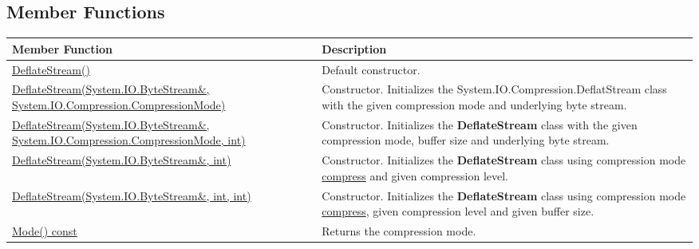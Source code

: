\documentclass[a4paper,oneside,11.000000pt]{book}
\begin{document}
\subsection{Member Functions}
\begin{flushleft}
\begin{supertabular}[l]{!{\raggedright}p{7.575cm}!{\raggedright}p{7.575cm}}
\textbf{Member Function}
& \textbf{Description}
\\
\hline
\hyperlink{System.IO.Compression.DeflateStream.constructor.P.System.IO.Compression.DeflateStream}{DeflateStream()}
& Default constructor.

\\
\hyperlink{System.IO.Compression.DeflateStream.constructor.P.System.IO.Compression.DeflateStream.R.System.IO.ByteStream.System.IO.Compression.CompressionMode}{DeflateStream(System.\-IO.\-ByteStream\&\-, System.\-IO.\-Compression.\-CompressionMode)}
& Constructor. Initializes the System.\-IO.\-Compression.\-DeflatStream class with the given compression mode and underlying byte stream.

\\
\hyperlink{System.IO.Compression.DeflateStream.constructor.P.System.IO.Compression.DeflateStream.R.System.IO.ByteStream.System.IO.Compression.CompressionMode.int}{DeflateStream(System.\-IO.\-ByteStream\&\-, System.\-IO.\-Compression.\-CompressionMode, int)}
& Constructor. Initializes the \textbf{DeflateStream}
 class with the given compression mode, buffer size and underlying byte stream.

\\
\hyperlink{System.IO.Compression.DeflateStream.constructor.P.System.IO.Compression.DeflateStream.R.System.IO.ByteStream.int}{DeflateStream(System.\-IO.\-ByteStream\&\-, int)}
& Constructor. Initializes the \textbf{DeflateStream}
 class using compression mode \hyperlink{System.IO.Compression.CompressionMode.compress}{compress} and given compression level.

\\
\hyperlink{System.IO.Compression.DeflateStream.constructor.P.System.IO.Compression.DeflateStream.R.System.IO.ByteStream.int.int}{DeflateStream(System.\-IO.\-ByteStream\&\-, int, int)}
& Constructor. Initializes the \textbf{DeflateStream}
 class using compression mode \hyperlink{System.IO.Compression.CompressionMode.compress}{compress}, given compression level and
given buffer size.

\\
\hyperlink{System.IO.Compression.DeflateStream.Mode.C.P.System.IO.Compression.DeflateStream}{Mode() const}
& Returns the compression mode.


\end{supertabular}
\end{flushleft}
\end{document}
